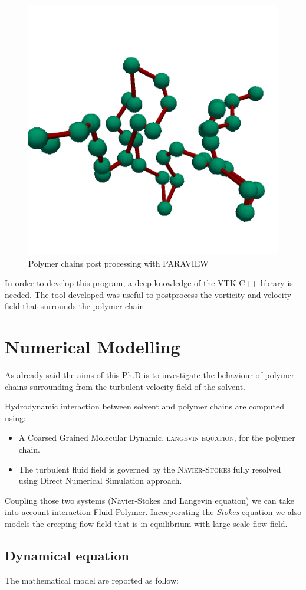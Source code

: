 \begin{figure}[h]
\centering
\includegraphics[width=.4\textwidth]{chain.png} 
\caption{Polymer chains post processing with PARAVIEW}
\label{fig:chains}
\end{figure}

In order to develop this program, a deep knowledge of the VTK C++ library is needed. 
The tool developed was useful to postprocess the vorticity and velocity field that surrounds 
the polymer chain

\section{Numerical Modelling}

As already said the aims of this Ph.D is to investigate the behaviour of polymer chains surrounding from the 
turbulent velocity field of the solvent. 

Hydrodynamic interaction between solvent and polymer chains are computed using:
\begin{itemize}
\item A Coarsed Grained Molecular Dynamic, \textsc{langevin equation}, for the polymer chain. 

\item The turbulent fluid field is governed by the \textsc{Navier-Stokes} fully resolved using Direct Numerical Simulation approach.   
\end{itemize}

Coupling those two systems (Navier-Stokes and Langevin equation) 
we can take into account interaction Fluid-Polymer. Incorporating the \textit{Stokes} equation we also models the creeping flow field that is in equilibrium with large scale flow field. 

\subsection{Dynamical equation}
The mathematical model are reported as follow:


